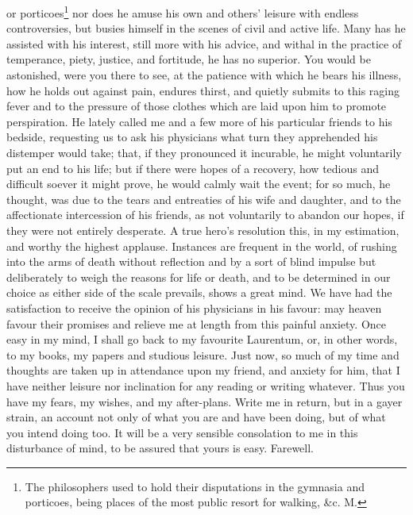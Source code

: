 or porticoes\footnote{The philosophers used to
hold their disputations in the gymnasia and porticoes, being places of the
most public resort for walking, \&c. M.} nor does he amuse his own and others' leisure
with endless controversies, but busies himself in the scenes of civil and
active life. Many has he assisted with his interest, still more with his
advice, and withal in the practice of temperance, piety, justice, and
fortitude, he has no superior. You would be astonished, were you there to
see, at the patience with which he bears his illness, how he holds out
against pain, endures thirst, and quietly submits to this raging fever and
to the pressure of those clothes which are laid upon him to promote
perspiration. He lately called me and a few more of his particular friends
to his bedside, requesting us to ask his physicians what turn they
apprehended his distemper would take; that, if they pronounced it
incurable, he might voluntarily put an end to his life; but if there were
hopes of a recovery, how tedious and difficult soever it might prove, he
would calmly wait the event; for so much, he thought, was due to the tears
and entreaties of his wife and daughter, and to the affectionate
intercession of his friends, as not voluntarily to abandon our hopes, if
they were not entirely desperate. A true hero's resolution this, in my
estimation, and worthy the highest applause. Instances are frequent in the
world, of rushing into the arms of death without reflection and by a sort
of blind impulse but deliberately to weigh the reasons for life or death,
and to be determined in our choice as either side of the scale prevails,
shows a great mind. We have had the satisfaction to receive the opinion of
his physicians in his favour: may heaven favour their promises and relieve
me at length from this painful anxiety. Once easy in my mind, I shall go
back to my favourite Laurentum, or, in other words, to my books, my papers
and studious leisure. Just now, so much of my time and thoughts are taken
up in attendance upon my friend, and anxiety for him, that I have neither
leisure nor inclination for any reading or writing whatever. Thus you have
my fears, my wishes, and my after-plans. Write me in return, but in a
gayer strain, an account not only of what you are and have been doing, but
of what you intend doing too. It will be a very sensible consolation to me
in this disturbance of mind, to be assured that yours is easy. Farewell.


